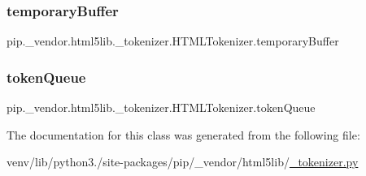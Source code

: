 \subsubsection{\texorpdfstring{temporary\+Buffer}{temporaryBuffer}}
{\footnotesize\ttfamily pip.\+\_\+vendor.\+html5lib.\+\_\+tokenizer.\+H\+T\+M\+L\+Tokenizer.\+temporary\+Buffer}

\mbox{\label{classpip_1_1__vendor_1_1html5lib_1_1__tokenizer_1_1HTMLTokenizer_a3f135816cc74990ced9141b178b47344}} 
\subsubsection{\texorpdfstring{token\+Queue}{tokenQueue}}
{\footnotesize\ttfamily pip.\+\_\+vendor.\+html5lib.\+\_\+tokenizer.\+H\+T\+M\+L\+Tokenizer.\+token\+Queue}



The documentation for this class was generated from the following file\+:\begin{DoxyCompactItemize}
\item 
venv/lib/python3./site-\/packages/pip/\+\_\+vendor/html5lib/\hyperlink{__tokenizer_8py}{\+\_\+tokenizer.\+py}\end{DoxyCompactItemize}
